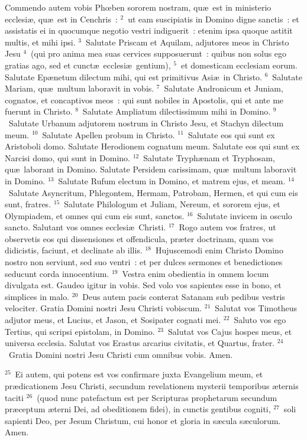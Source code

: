 \lettrine[lines=10,image=true,loversize=0.05,lraise=-0.03]{C}{}ommendo autem vobis Phœben sororem nostram, qu\ae\ est in ministerio ecclesi\ae , qu\ae\ est in Cenchris~:
${}^{2}$~ut eam suscipiatis in Domino digne sanctis~: et assistatis ei in quocumque negotio vestri indiguerit~: etenim ipsa quoque astitit multis, et mihi ipsi.
${}^{3}$~Salutate Priscam et Aquilam, adjutores meos in Christo Jesu
${}^{4}$~(qui pro anima mea suas cervices supposuerunt~: quibus non solus ego gratias ago, sed et cunct\ae\ ecclesi\ae\ gentium),
${}^{5}$~et domesticam ecclesiam eorum. Salutate Ep\ae netum dilectum mihi, qui est primitivus Asi\ae\ in Christo.
${}^{6}$~Salutate Mariam, qu\ae\ multum laboravit in vobis.
${}^{7}$~Salutate Andronicum et Juniam, cognatos, et concaptivos meos~: qui sunt nobiles in Apostolis, qui et ante me fuerunt in Christo.
${}^{8}$~Salutate Ampliatum dilectissimum mihi in Domino.
${}^{9}$~Salutate Urbanum adjutorem nostrum in Christo Jesu, et Stachyn dilectum meum.
${}^{10}$~Salutate Apellen probum in Christo.
${}^{11}$~Salutate eos qui sunt ex Aristoboli domo. Salutate Herodionem cognatum meum. Salutate eos qui sunt ex Narcisi domo, qui sunt in Domino.
${}^{12}$~Salutate Tryph\ae nam et Tryphosam, qu\ae\ laborant in Domino. Salutate Persidem carissimam, qu\ae\ multum laboravit in Domino.
${}^{13}$~Salutate Rufum electum in Domino, et matrem ejus, et meam.
${}^{14}$~Salutate Asyncritum, Phlegontem, Hermam, Patrobam, Hermen, et qui cum eis sunt, fratres.
${}^{15}$~Salutate Philologum et Juliam, Nereum, et sororem ejus, et Olympiadem, et omnes qui cum eis sunt, sanctos.
${}^{16}$~Salutate invicem in osculo sancto. Salutant vos omnes ecclesi\ae\ Christi.
${}^{17}$~Rogo autem vos fratres, ut observetis eos qui dissensiones et offendicula, pr\ae ter doctrinam, quam vos didicistis, faciunt, et declinate ab illis.
${}^{18}$~Hujuscemodi enim Christo Domino nostro non serviunt, sed suo ventri~: et per dulces sermones et benedictiones seducunt corda innocentium.
${}^{19}$~Vestra enim obedientia in omnem locum divulgata est. Gaudeo igitur in vobis. Sed volo vos sapientes esse in bono, et simplices in malo.
${}^{20}$~Deus autem pacis conterat Satanam sub pedibus vestris velociter. Gratia Domini nostri Jesu Christi vobiscum.
${}^{21}$~Salutat vos Timotheus adjutor meus, et Lucius, et Jason, et Sosipater cognati mei.
${}^{22}$~Saluto vos ego Tertius, qui scripsi epistolam, in Domino.
${}^{23}$~Salutat vos Cajus hospes meus, et universa ecclesia. Salutat vos Erastus arcarius civitatis, et Quartus, frater.
${}^{24}$~Gratia Domini nostri Jesu Christi cum omnibus vobis. Amen.


${}^{25}$~Ei autem, qui potens est vos confirmare juxta Evangelium meum, et pr\ae dicationem Jesu Christi, secundum revelationem mysterii temporibus \ae ternis taciti
${}^{26}$~(quod nunc patefactum est per Scripturas prophetarum secundum pr\ae ceptum \ae terni Dei, ad obeditionem fidei), in cunctis gentibus cogniti,
${}^{27}$~soli sapienti Deo, per Jesum Christum, cui honor et gloria in s\ae cula s\ae culorum. Amen.
